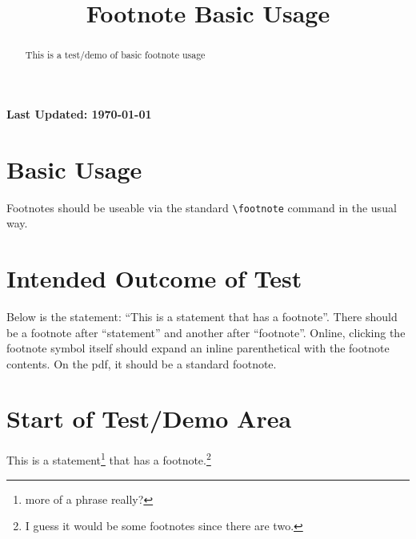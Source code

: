 \documentclass{ximera}
\title{Footnote Basic Usage}
\begin{document}
\begin{abstract}
    This is a test/demo of basic footnote usage
\end{abstract}
\maketitle

{{\Huge \bfseries Last Updated: \today}} \\

\section{Basic Usage}
Footnotes should be useable via the standard \verb|\footnote| command in the usual way.

\section{Intended Outcome of Test}
Below is the statement: ``This is a statement that has a footnote''. There should be a footnote after ``statement'' and another after ``footnote''.
Online, clicking the footnote symbol itself should expand an inline parenthetical with the footnote contents. On the pdf, it should be 
a standard footnote.

\section{Start of Test/Demo Area}
This is a statement\footnote{more of a phrase really?} that has a footnote.\footnote{I guess it would be some footnotes since there are two.}

\hrulefill
\end{document}
